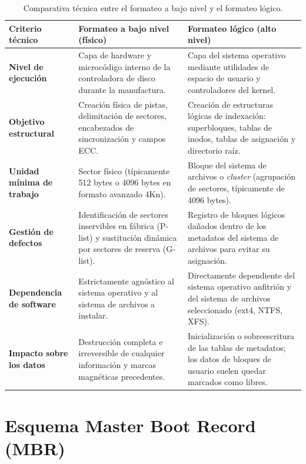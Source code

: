 \documentclass[12pt]{article}
\begin{document}
\begin{table}[!t]
\centering
\small
\renewcommand{\arraystretch}{1.1}
\renewcommand{\tabularxcolumn}[1]{m{#1}}
\setlength{\emergencystretch}{1.5em}
\caption{Comparativa técnica entre el formateo a bajo nivel y el formateo lógico.}
\label{tab:comparativaFormateoNivel}
\begin{tabularx}{\textwidth}{>{\centering\arraybackslash}m{2.8cm} X X}
\toprule
\textbf{Criterio técnico} & \textbf{Formateo a bajo nivel (físico)} & \textbf{Formateo lógico (alto nivel)} \\
\midrule
\textbf{Nivel de ejecución} & Capa de hardware y microcódigo interno de la controladora de disco durante la manufactura. & Capa del sistema operativo mediante utilidades de espacio de usuario y controladores del kernel. \\
\addlinespace
\textbf{Objetivo estructural} & Creación física de pistas, delimitación de sectores, encabezados de sincronización y campos ECC. & Creación de estructuras lógicas de indexación: superbloques, tablas de inodos, tablas de asignación y directorio raíz. \\
\addlinespace
\textbf{Unidad mínima de trabajo} & Sector físico (típicamente 512 bytes o 4096 bytes en formato avanzado 4Kn). & Bloque del sistema de archivos o \textit{cluster} (agrupación de sectores, típicamente de 4096 bytes). \\
\addlinespace
\textbf{Gestión de defectos} & Identificación de sectores inservibles en fábrica (P-list) y sustitución dinámica por sectores de reserva (G-list). & Registro de bloques lógicos dañados dentro de los metadatos del sistema de archivos para evitar su asignación. \\
\addlinespace
\textbf{Dependencia de software} & Estrictamente agnóstico al sistema operativo y al sistema de archivos a instalar. & Directamente dependiente del sistema operativo anfitrión y del sistema de archivos seleccionado (ext4, NTFS, XFS). \\
\addlinespace
\textbf{Impacto sobre los datos} & Destrucción completa e irreversible de cualquier información y marcas magnéticas precedentes. & Inicialización o sobreescritura de las tablas de metadatos; los datos de bloques de usuario suelen quedar marcados como libres. \\
\bottomrule
\end{tabularx}
\end{table}

\section{Esquema Master Boot Record (MBR)}
\label{sec:esquemaMbr}
\end{document}
